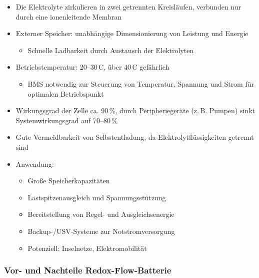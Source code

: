 \begin{itemize}
  \item Die Elektrolyte zirkulieren in zwei getrennten Kreisläufen, verbunden nur durch eine ionenleitende Membran
  \item Externer Speicher: unabhängige Dimensionierung von Leistung und Energie
  \begin{itemize}
    \item Schnelle \glqq Ladbarkeit\grqq{} durch Austausch der Elektrolyten
  \end{itemize}
  \item Betriebstemperatur: 20--30\,\textdegree C, über 40\,\textdegree C gefährlich
  \begin{itemize}
    \item BMS notwendig zur Steuerung von Temperatur, Spannung und Strom für optimalen Betriebspunkt
  \end{itemize}
  \item Wirkungsgrad der Zelle ca. 90\,\%, durch Peripheriegeräte (z.\,B. Pumpen) sinkt Systemwirkungsgrad auf 70--80\,\%
  \item Gute Vermeidbarkeit von Selbstentladung, da Elektrolytflüssigkeiten getrennt sind
  \item Anwendung:
  \begin{itemize}
    \item Große Speicherkapazitäten
    \item Lastspitzenausgleich und Spannungsstützung
    \item Bereitstellung von Regel- und Ausgleichsenergie
    \item Backup-/USV-Systeme zur Notstromversorgung
    \item Potenziell: Inselnetze, Elektromobilität
  \end{itemize}
\end{itemize}



\subsubsection{Vor- und Nachteile Redox-Flow-Batterie}

